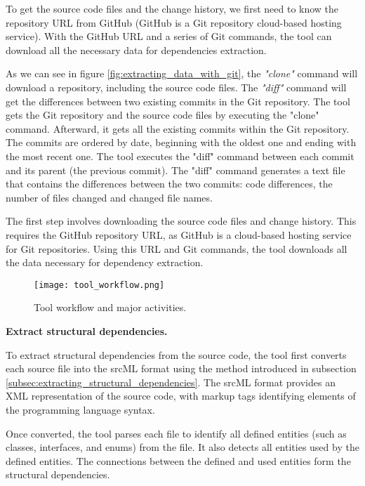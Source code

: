 To get the source code files and the change history, we first need to know the repository URL from GitHub (GitHub is a Git repository cloud-based hosting service). With the GitHub URL and a series of Git commands, the tool can download all the necessary data for dependencies extraction.


As we can see in figure \ref{fig:extracting_data_with_git}, the \textit{"clone"} command will download a repository, including the source code files. The \textit{"diff"} command will get the differences between two existing commits in the Git repository. 
The tool gets the Git repository and the source code files by executing the "clone" command. Afterward, it gets all the existing commits within the Git repository. The commits are ordered by date, beginning with the oldest one and ending with the most recent one. The tool executes the "diff" command between each commit and its parent (the previous commit). The "diff" command generates a text file that contains the differences between the two commits: code differences, the number of files changed and changed file names.


The first step involves downloading the source code files and change history. This requires the GitHub repository URL, as GitHub is a cloud-based hosting service for Git repositories. Using this URL and Git commands, the tool downloads all the data necessary for dependency extraction.

\begin{figure}[H]
\centering
\texttt{[image: tool\_workflow.png]}
\caption{Tool workflow and major activities.}
\label{fig:figworkflow}
\end{figure}



\textbf{Extract structural dependencies.}

To extract structural dependencies from the source code, the tool first converts each source file into the srcML format using the method introduced in subsection \ref{subsec:extracting_structural_dependencies}. The srcML format provides an XML representation of the source code, with markup tags identifying elements of the programming language syntax\cite{srcML}. 

Once converted, the tool parses each file to identify all defined entities (such as classes, interfaces, and enums) from the file. It also detects all entities used by the defined entities. The connections between the defined and used entities form the structural dependencies.


